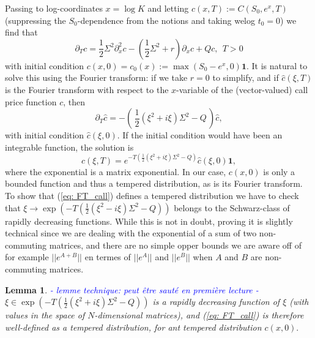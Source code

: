 \documentclass[a4paper, 11pt]{amsart}
\newtheorem{lemma}[theorem]{Lemma}
\newtheorem{definition and theorem}[theorem]{Definition and   
Theorem}
\begin{document}
Passing to log-coordinates $x = \log K $ and letting $c (x, T ) := C (S_0 , e^x , T ) $ (suppressing the $S_0  $-dependence from the notions and taking welog $t_0 = 0 $) we find that
\begin{equation}
    \partial _T c = \frac{1 }{2 } \Sigma ^2 \partial _x ^2 c - \left(  \frac{1 }{2 } \Sigma ^2 + r \right) \partial _x c + Q c , \ \ T > 0
\end{equation}
with initial condition $c (x, 0 ) = c_0 (x) := \max ( S_0 - e^x , 0 ) \mathbf{1 } . $ It is natural to solve this using the Fourier transform: if we take $r = 0 $ to simplify, and if $\widehat{c }  (\xi , T ) $ is the Fourier transform with respect to the $x $-variable of the (vector-valued) call price function $c $, then
$$
    \partial _T \widehat{c } = - \left( \, \frac{1 }{2 } (\xi ^2 + i \xi ) \Sigma ^2 - Q \, \right) \widehat{c } ,
$$
with initial condition $\widehat{c } (\xi , 0 ) . $ If the initial condition would have been an integrable function, the solution is
\begin{equation} \label{eq: FT_call}
    c(\xi , T ) = e^{- T ( \frac{1 }{2 } (\xi ^2 + i \xi  )\Sigma ^2 - Q ) }\widehat{c } (\xi , 0 )  \mathbf{1 } ,
\end{equation}
where the exponential is a matrix exponential. In our case, $c (x, 0 ) $ is only a bounded function and thus a tempered distribution, as is its Fourier transform. To show that (\ref{eq: FT_call}) defines a tempered distribution we have to check that $\xi \to \exp ( - T ( \frac{1 }{2 } (\xi ^2 - i \xi ) \Sigma ^2 - Q ) ) $ belongs to the Schwarz-class of rapidly decreasing functions. While this is not in doubt, proving it is slightly technical since we are dealing with the exponential of a sum of two non-commuting matrices, and there are no simple opper bounds we are aware off of for example $|| e^{A + B } || $ en termes of $|| e^A || $ and $|| e^B || $ when $A $ and $B $ are non-commuting matrices.

\begin{lemma} \textcolor{blue}{ - lemme technique: peut \^etre saut\'e en premi\`ere lecture - } $\xi \in \exp ( - T ( \frac{1 }{2 } (\xi ^2 + i \xi ) \Sigma ^2 - Q ) ) $ is a rapidly decreasing function of $\xi $ (with values in the space of $N $-dimensional matrices), and (\ref{eq: FT_call}) is therefore well-defined as a tempered distribution, for ant tempered distribution $c(x, 0 ) . $
\end{lemma}
\end{document}
